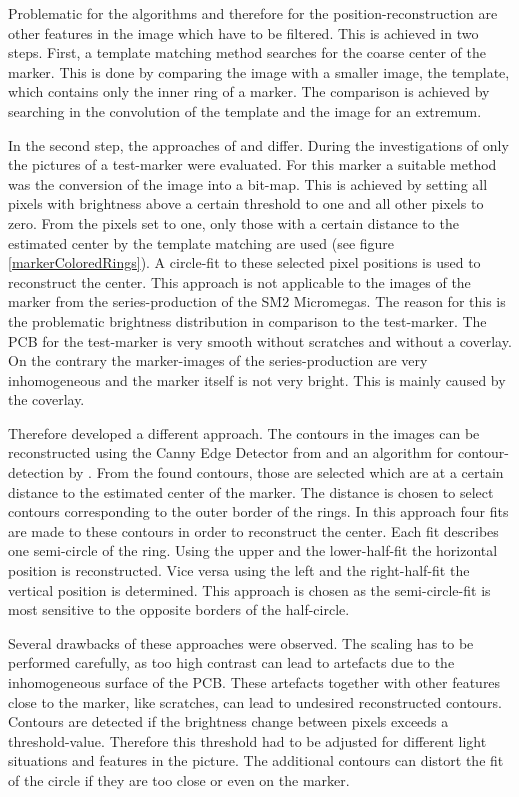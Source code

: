 \documentclass[
twoside,            %
BCOR1.4cm,          %
10pt,               %
headings=normal,    %
headsepline,        %
clearplainpage,		%
final,              %
div=14,
open=right,
bibliography=toc
]{scrreprt}
\begin{document}
Problematic for the algorithms and therefore for the position-reconstruction are other features in the image which have to be filtered.
This is achieved in two steps.
First, a template matching method searches for the coarse center of the marker.
This is done by comparing the image with a smaller image, the template, which contains only the inner ring of a marker.
The comparison is achieved by searching in the convolution of the template and the image for an extremum.

In the second step, the approaches of \cite{feilThesis} and \cite{neubertThesis} differ.
During the investigations of \cite{feilThesis} only the pictures of a test-marker were evaluated.
For this marker a suitable method was the conversion of the image into a bit-map.
This is achieved by setting all pixels with brightness above a certain threshold to one and all other pixels to zero.
From the pixels set to one, only those with a certain distance to the estimated center by the template matching are used (see figure \ref{markerColoredRings}).
A circle-fit to these selected pixel positions is used to reconstruct the center.
This approach is not applicable to the images of the marker from the series-production of the SM2 Micromegas.
The reason for this is the problematic brightness distribution in comparison to the test-marker.
The PCB for the test-marker is very smooth without scratches and without a coverlay.
On the contrary the marker-images of the series-production are very inhomogeneous and the marker itself is not very bright.
This is mainly caused by the coverlay.

Therefore \cite{neubertThesis} developed a different approach.
The contours in the images can be reconstructed using the Canny Edge Detector from \cite{canny} and an algorithm for contour-detection by \cite{suzuki85}.
From the found contours, those are selected which are at a certain distance to the estimated center of the marker.
The distance is chosen to select contours corresponding to the outer border of the rings.
In this approach four fits are made to these contours in order to reconstruct the center.
Each fit describes one semi-circle of the ring.
Using the upper and the lower-half-fit the horizontal position is reconstructed.
Vice versa using the left and the right-half-fit the vertical position is determined.
This approach is chosen as the semi-circle-fit is most sensitive to the opposite borders of the half-circle.

Several drawbacks of these approaches were observed.
The scaling has to be performed carefully, as too high contrast can lead to artefacts due to the inhomogeneous surface of the PCB.
These artefacts together with other features close to the marker, like scratches, can lead to undesired reconstructed contours.
Contours are detected if the brightness change between pixels exceeds a threshold-value.
Therefore this threshold had to be adjusted for different light situations and features in the picture.
The additional contours can distort the fit of the circle if they are too close or even on the marker.
\end{document}
